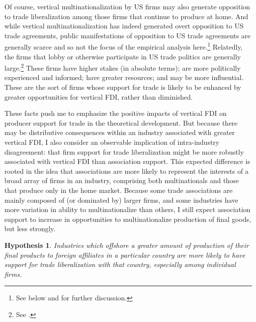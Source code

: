 \documentclass[hidelinks,12pt,letter]{article}
\newtheorem{hypo}{Hypothesis}
\begin{document}
Of course, vertical multinationalization by US firms may also generate opposition to trade liberalization among those firms that continue to produce at home. And while vertical multinationalization has indeed generated overt opposition to US trade agreements, public manifestations of opposition to US trade agreements are generally scarce and so not the focus of the empirical analysis here.\footnote{See below and \citealt{osgood2017breakdown} for further discussion.} Relatedly, the firms that lobby or otherwise participate in US trade politics are generally large.\footnote{See \citealt{drope2006does,lux2011mixing,kim2017political}.} These firms have higher stakes (in absolute terms); are more politically experienced and informed; have greater resources; and may be more influential. These are the sort of firms whose support for trade is likely to be enhanced by greater opportunities for vertical FDI, rather than diminished. 

These facts push me to emphasize the positive impacts of vertical FDI on producer support for trade in the theoretical development. But because there may be distributive consequences within an industry associated with greater vertical FDI, I also consider an observable implication of intra-industry disagreement: that firm support for trade liberalization might be more robustly associated with vertical FDI than association support.  This expected difference is rooted in the idea that associations are more likely to represent the interests of a broad array of firms in an industry, comprising both multinationals and those that produce only in the home market. Because some trade associations are mainly composed of (or dominated by) larger firms, and some industries have more variation in ability to multinationalize than others, I still expect association support to increase in opportunities to multinationalize production of final goods, but less strongly.
\begin{hypo}
Industries which offshore a greater amount of production of their final products to foreign affiliates in a particular country are more likely to have support for trade liberalization with that country, especially among individual firms.
\end{hypo}
\end{document}
